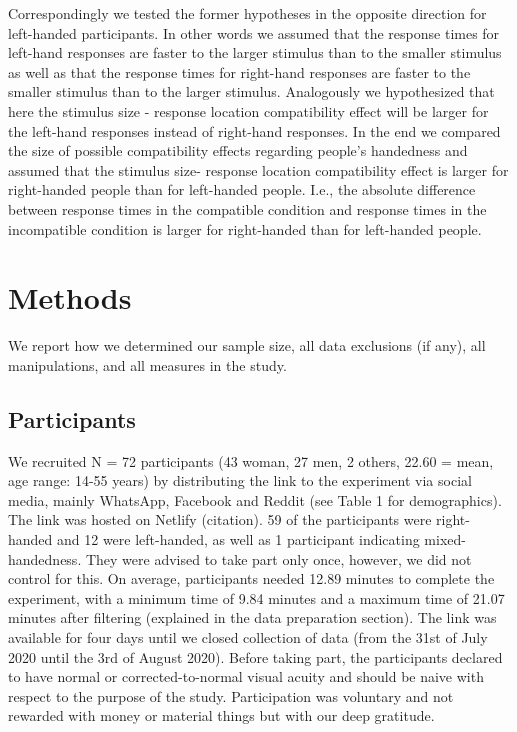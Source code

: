 \documentclass[
  english,
  man,floatsintext]{apa6}
\begin{document}
Correspondingly we tested the former hypotheses in the opposite direction for left-handed participants. In other words we assumed that the response times for left-hand responses are faster to the larger stimulus than to the smaller stimulus as well as that the response times for right-hand responses are faster to the smaller stimulus than to the larger stimulus. Analogously we hypothesized that here the stimulus size - response location compatibility effect will be larger for the left-hand responses instead of right-hand responses. In the end we compared the size of possible compatibility effects regarding people's handedness and assumed that the stimulus size- response location compatibility effect is larger for right-handed people than for left-handed people. I.e., the absolute difference between response times in the compatible condition and response times in the incompatible condition is larger for right-handed than for left-handed people.

\hypertarget{methods}{%
\section{Methods}\label{methods}}

We report how we determined our sample size, all data exclusions (if any), all manipulations, and all measures in the study.

\hypertarget{participants}{%
\subsection{Participants}\label{participants}}

We recruited N = 72 participants (43 woman, 27 men, 2 others, 22.60 = mean, age range: 14-55 years) by distributing the link to the experiment via social media, mainly WhatsApp, Facebook and Reddit (see Table 1 for demographics). The link was hosted on Netlify (citation). 59 of the participants were right-handed and 12 were left-handed, as well as 1 participant indicating mixed-handedness. They were advised to take part only once, however, we did not control for this. On average, participants needed 12.89 minutes to complete the experiment, with a minimum time of 9.84 minutes and a maximum time of 21.07 minutes after filtering (explained in the data preparation section). The link was available for four days until we closed collection of data (from the 31st of July 2020 until the 3rd of August 2020). Before taking part, the participants declared to have normal or corrected-to-normal visual acuity and should be naive with respect to the purpose of the study. Participation was voluntary and not rewarded with money or material things but with our deep gratitude.
\end{document}
